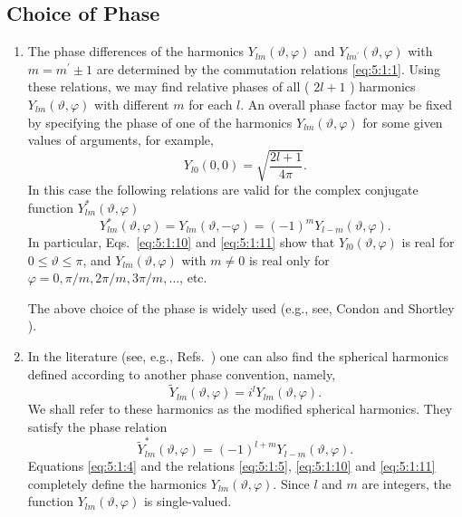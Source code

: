 \subsection{Choice of Phase}\label{sec:5.1.5}
\begin{enumerate}[label=(\alph*)]
  \item The phase differences of the harmonics $Y_{l m}(\vartheta, \varphi)$ and $Y_{l m^{\prime}}(\vartheta, \varphi)$ with $m=m^{\prime} \pm 1$ are determined by the commutation relations \eqref{eq:5:1:1}. Using these relations, we may find relative phases of all ( $2 l+1$ ) harmonics $Y_{l m}(\vartheta, \varphi)$ with different $m$ for each $l$. An overall phase factor may be fixed by specifying the phase of one of the harmonics $Y_{l m}(\vartheta, \varphi)$ for some given values of arguments, for example,
\begin{equation}
Y_{l 0}(0,0)=\sqrt{\frac{2 l+1}{4 \pi}} . \label{eq:5:1:10}
\end{equation}
In this case the following relations are valid for the complex conjugate function $Y_{l m}^{*}(\vartheta, \varphi)$
\begin{equation}
Y_{l m}^{*}(\vartheta, \varphi)=Y_{l m}(\vartheta,-\varphi)=(-1)^{m} Y_{l-m}(\vartheta, \varphi) . \label{eq:5:1:11}
\end{equation}
In particular, Eqs.~\eqref{eq:5:1:10} and \eqref{eq:5:1:11} show that $Y_{l 0}(\vartheta, \varphi)$ is real for $0 \leq \vartheta \leq \pi$, and $Y_{l m}(\vartheta, \varphi)$ with $m \neq 0$ is real only for $\varphi=0, \pi / m, 2 \pi / m, 3 \pi / m, \ldots$, etc.

The above choice of the phase is widely used (e.g., see, Condon and Shortley \cite{ref010}).
\item In the literature (see, e.g., Refs.~\cite{ref006, ref018}) one can also find the spherical harmonics defined according to another phase convention, namely,
\begin{equation}
\tilde{Y}_{l m}(\vartheta, \varphi)=i^{l} Y_{l m}(\vartheta, \varphi). \label{eq:5:1:12}
\end{equation}
We shall refer to these harmonics as the modified spherical harmonics. They satisfy the phase relation
\begin{equation}
\tilde{Y}_{l m}^{*}(\vartheta, \varphi)=(-1)^{l+m} Y_{l-m}(\vartheta, \varphi) . \label{eq:5:1:13}
\end{equation}
Equations \eqref{eq:5:1:4} and the relations \eqref{eq:5:1:5}, \eqref{eq:5:1:10} and \eqref{eq:5:1:11} completely define the harmonics $Y_{l m}(\vartheta, \varphi)$. Since $l$ and $m$ are integers, the function $Y_{l m}(\vartheta, \varphi)$ is single-valued.
\end{enumerate}

